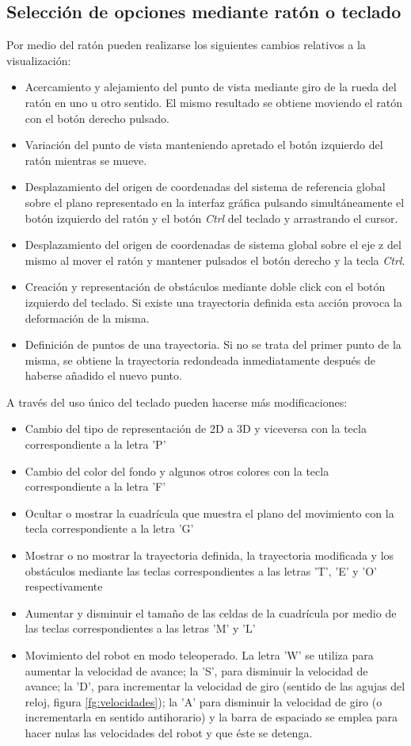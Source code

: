 \subsection{Selección de opciones mediante ratón o teclado}
Por medio del ratón pueden realizarse los siguientes cambios relativos a la visualización:
\begin{itemize}
  \item Acercamiento y alejamiento del punto de vista mediante giro de la rueda del ratón en uno u otro sentido. El mismo resultado se obtiene moviendo el ratón con el botón derecho pulsado.
  \item Variación del punto de vista manteniendo apretado el botón izquierdo del ratón mientras se mueve.
  \item Desplazamiento del origen de coordenadas del sistema de referencia global sobre el plano representado en la interfaz gráfica pulsando simultáneamente el botón izquierdo del ratón y el botón \emph{Ctrl} del teclado y arrastrando el cursor.
  \item Desplazamiento del origen de coordenadas de sistema global sobre el eje z del mismo al mover el ratón y mantener pulsados el botón derecho y la tecla \emph{Ctrl}.
  \item Creación y representación de obstáculos mediante doble click con el botón izquierdo del teclado. Si existe una trayectoria definida esta acción provoca la deformación de la misma.
  \item Definición de puntos de una trayectoria. Si no se trata del primer punto de la misma, se obtiene la trayectoria redondeada inmediatamente después de haberse añadido el nuevo punto.
\end{itemize}

A través del uso único del teclado pueden hacerse más modificaciones:
\begin{itemize}
  \item Cambio del tipo de representación de 2D a 3D y viceversa con la tecla correspondiente a la letra 'P'
  \item Cambio del color del fondo y algunos otros colores con la tecla correspondiente a la letra 'F'
  \item Ocultar o mostrar la cuadrícula que muestra el plano del movimiento con la tecla correspondiente a la letra 'G'
  \item Mostrar o no mostrar la trayectoria definida, la trayectoria modificada y los obstáculos mediante las teclas correspondientes a las letras 'T', 'E' y 'O' respectivamente
  \item Aumentar y disminuir el tamaño de las celdas de la cuadrícula por medio de las teclas correspondientes a las letras 'M' y 'L'
  \item Movimiento del robot en modo teleoperado. La letra 'W' se utiliza para aumentar la velocidad de avance; la 'S', para disminuir la velocidad de avance; la 'D', para incrementar la velocidad de giro (sentido de las agujas del reloj, figura \ref{fg:velocidades}); la 'A' para disminuir la velocidad de giro (o incrementarla en sentido antihorario) y la barra de espaciado se emplea para hacer nulas las velocidades del robot y que éste se detenga.
\end{itemize} 